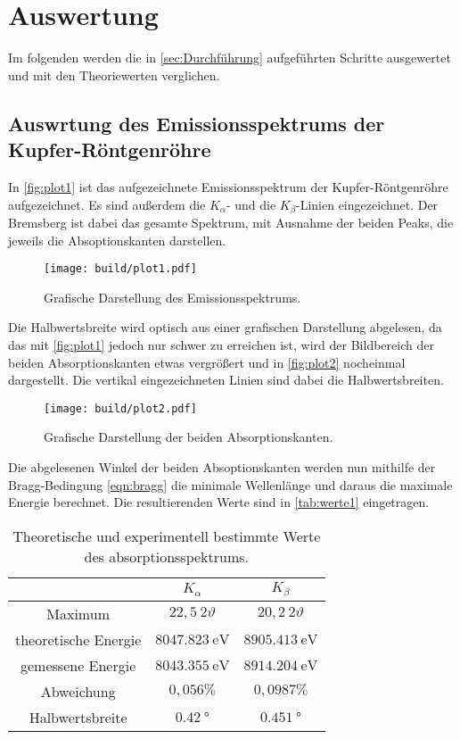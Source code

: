 \section{Auswertung}
\label{sec:Auswertung}

Im folgenden werden die in \autoref{sec:Durchführung} aufgeführten Schritte ausgewertet und mit den Theoriewerten verglichen.

\subsection{Auswrtung des Emissionsspektrums der Kupfer-Röntgenröhre}
In \autoref{fig:plot1} ist das aufgezeichnete Emissionsspektrum der Kupfer-Röntgenröhre aufgezeichnet. Es sind außerdem die $K_\alpha$- und die $K_\beta$-Linien
eingezeichnet. Der Bremsberg ist dabei das gesamte Spektrum, mit Ausnahme der beiden Peaks, die jeweils die Absoptionskanten darstellen. 

\begin{figure}[H]
  \centering
  \texttt{[image: build/plot1.pdf]}
  \caption{Grafische Darstellung des Emissionsspektrums.}
  \label{fig:plot1}
\end{figure}

Die Halbwertsbreite wird optisch aus einer grafischen Darstellung abgelesen, da das mit \autoref{fig:plot1} jedoch nur schwer zu erreichen ist, wird der Bildbereich
der beiden Absorptionskanten etwas vergrößert und in \autoref{fig:plot2} nocheinmal dargestellt. Die vertikal eingezeichneten Linien sind dabei die Halbwertsbreiten.

\begin{figure}[H]
  \centering
  \texttt{[image: build/plot2.pdf]}
  \caption{Grafische Darstellung der beiden Absorptionskanten.}
  \label{fig:plot2}
\end{figure}

Die abgelesenen Winkel der beiden Absoptionskanten werden nun mithilfe der Bragg-Bedingung \eqref{eqn:bragg} die minimale Wellenlänge und daraus die maximale Energie
berechnet. Die resultierenden Werte sind in \autoref{tab:werte1} eingetragen.
\begin{table}[H]
  \caption{Theoretische und experimentell bestimmte Werte des absorptionsspektrums.}
  \label{tab:werte1}
  \centering
  \begin{tabular}{c c c}
      \toprule
       & $K_\alpha$ & $K_\beta$\\
      \midrule
      Maximum & $22,5 ~ 2\vartheta$ & $20,2 ~ 2\vartheta$ \\
      theoretische Energie & $\SI{8047,823}{\eV}$ & $\SI{8905,413}{\eV}$ \\
      gemessene Energie & $\SI{8043,355}{\eV}$ & $\SI{8914,204}{\eV}$ \\
      Abweichung & $0,056 \%$ & $0,0987 \%$ \\
      Halbwertsbreite & $\SI{0,42}{\degree}$ & $\SI{0,451}{\degree}$ \\
      \bottomrule
    \end{tabular}
\end{table}

